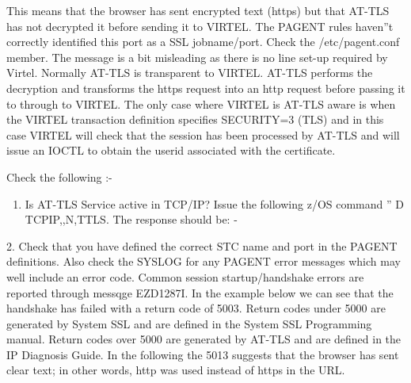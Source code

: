 \documentclass[letterpaper,10pt,english]{sphinxmanual}
\begin{document}
This means that the browser has sent encrypted text (https) but that AT-TLS has not decrypted it before sending it to VIRTEL. The PAGENT rules haven”t correctly identified this port as a SSL jobname/port. Check the /etc/pagent.conf member. The message is a bit misleading as there is no line set-up required by Virtel.  Normally AT-TLS is transparent to VIRTEL. AT-TLS performs the decryption and transforms the https request into an http request before passing it to through to VIRTEL. The only case where VIRTEL is AT-TLS aware is when the VIRTEL transaction definition specifies SECURITY=3 (TLS) and in this case VIRTEL will check that the session has been processed by AT-TLS and will issue an IOCTL to obtain the userid associated with the certificate.

Check the following :-
\begin{enumerate}
\def\theenumi{\arabic{enumi}}
\def\labelenumi{\theenumi .}
\makeatletter\def\p@enumii{\p@enumi \theenumi .}\makeatother
\item {} 
Is AT-TLS Service active in TCP/IP? Issue the following z/OS command ” D TCPIP,,N,TTLS. The response should be: -

\end{enumerate}

\begin{sphinxVerbatim}[commandchars=\\\{\}]
     
   
  
    
   
\end{sphinxVerbatim}

2. Check that you have defined the correct STC name and port in the PAGENT definitions. Also check the SYSLOG for any PAGENT error messages which may well include an error code. Common session startup/handshake errors are reported through messqge EZD1287I. In the example below we can see that the handshake has failed with a return code of 5003. Return codes under 5000 are generated by
System SSL and are defined in the System SSL Programming manual. Return codes over 5000 are generated by AT-TLS and are defined in the IP Diagnosis Guide. In the following the 5013 suggests that the browser has sent clear text; in other words, http was used instead of https in the URL.
\end{document}
